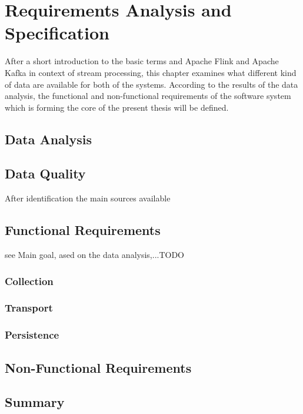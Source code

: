 \chapter{Requirements Analysis and Specification}

After a short introduction to the basic terms and Apache Flink and Apache Kafka in
context of stream processing, this chapter examines what different kind of data are available
for both of the systems. According to the results of the data analysis, the functional and
non-functional requirements of the software system which is forming the core of the present
thesis will be defined.

\section{Data Analysis}


\section{Data Quality}

After identification the main sources available
%

\section{Functional Requirements}
see Main goal, ased on the data analysis,...TODO
%
%
%
%
%
\subsection{Collection}

\subsection{Transport}

\subsection{Persistence}

\section{Non-Functional Requirements}

\section{Summary}